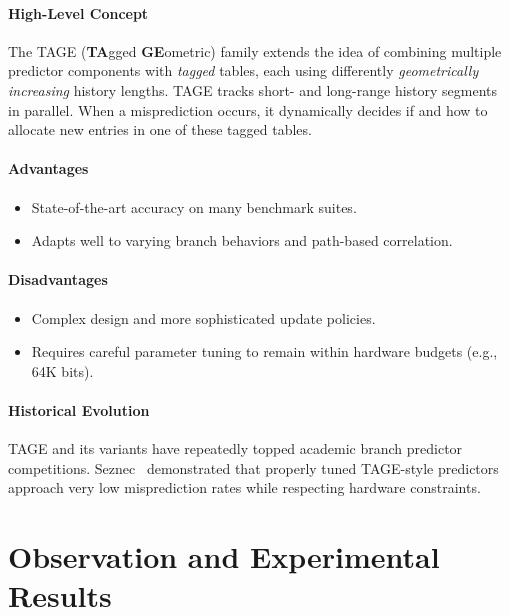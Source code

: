 \documentclass[11pt]{article}
\begin{document}
\paragraph{High-Level Concept}
The TAGE (\textbf{TA}gged \textbf{GE}ometric) family \cite{seznec2006cottage,seznec2007tage,seznec2011} extends the idea of combining multiple predictor components with \emph{tagged} tables, each using differently \emph{geometrically increasing} history lengths. TAGE tracks short- and long-range history segments in parallel. When a misprediction occurs, it dynamically decides if and how to allocate new entries in one of these tagged tables.

\paragraph{Advantages}
\begin{itemize}
    \item State-of-the-art accuracy on many benchmark suites.
    \item Adapts well to varying branch behaviors and path-based correlation.
\end{itemize}

\paragraph{Disadvantages}
\begin{itemize}
    \item Complex design and more sophisticated update policies.
    \item Requires careful parameter tuning to remain within hardware budgets (e.g., 64K bits).
\end{itemize}

\paragraph{Historical Evolution}
TAGE and its variants have repeatedly topped academic branch predictor competitions. Seznec~\cite{seznec2007tage} demonstrated that properly tuned TAGE-style predictors approach very low misprediction rates while respecting hardware constraints.

\section{Observation and Experimental Results}
\end{document}
